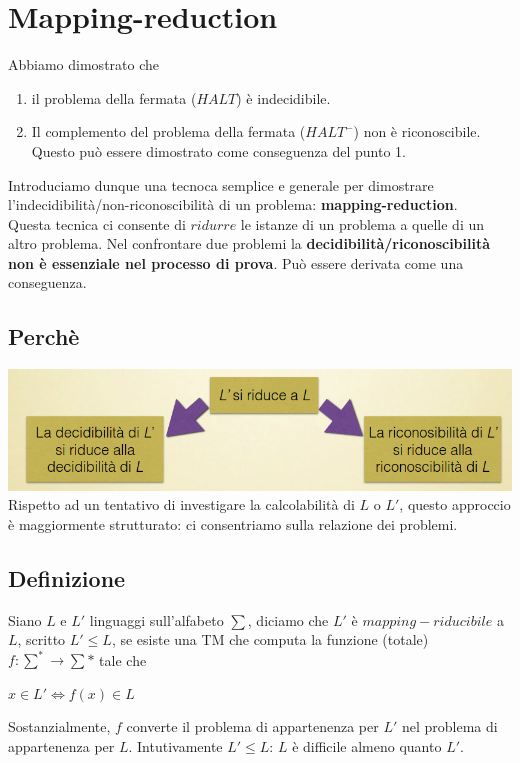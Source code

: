 \documentclass[a4paper, 12pt]{article}
\begin{document}
\section{Mapping-reduction}
Abbiamo dimostrato che 
\begin{enumerate}
\item il problema della fermata ($HALT$) \`e indecidibile.
\item Il complemento del problema della fermata ($HALT^{-}$) non \`e riconoscibile. Questo pu\`o essere dimostrato come conseguenza del punto 1.
\end{enumerate}
Introduciamo dunque una tecnoca semplice e generale per dimostrare l'indecidibilit\`a/non-riconoscibilit\`a di un problema: \textbf{mapping-reduction}.\\
Questa tecnica ci consente di $ridurre$ le istanze di un problema a quelle di un altro problema. Nel confrontare due problemi la \textbf{decidibilit\`a/riconoscibilit\`a non \`e essenziale nel processo di prova}. Pu\`o essere derivata come una conseguenza.
\subsection{Perch\`e}
\includegraphics[scale=0.5]{mapred1.png}\\
Rispetto ad un tentativo di investigare la calcolabilit\`a di $L$ o $L'$, questo approccio \`e maggiormente strutturato: ci consentriamo sulla relazione dei problemi.
\subsection{Definizione}
Siano $L$ e $L'$ linguaggi sull'alfabeto $\sum$, diciamo che $L'$ \`e $mapping-riducibile$ a $L$, scritto $L' \leq L$, se esiste una TM che computa la funzione (totale) $f: \sum^* \rightarrow \sum*$ tale che 
\begin{center}
$x \in L' \iff f(x) \in L$
\end{center}
Sostanzialmente, $f$ converte il problema di appartenenza per $L'$ nel problema di appartenenza per $L$. Intutivamente $L' \leq L$: $L$ \`e difficile almeno quanto $L'$.
\end{document}
